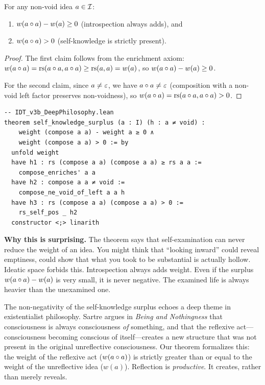 \begin{theorem}
\label{thm:self-knowledge-surplus}
For any non-void idea $a \in \mathcal{I}$:
\begin{enumerate}
\item $w(a \circ a) - w(a) \geq 0$
\hfill (introspection always adds), and
\item $w(a \circ a) > 0$
\hfill (self-knowledge is strictly present).
\end{enumerate}
\end{theorem}

\begin{proof}
The first claim follows from the enrichment axiom:
$w(a \circ a) = \mathrm{rs}(a \circ a, a \circ a)
\geq \mathrm{rs}(a, a) = w(a)$, so $w(a \circ a) - w(a) \geq 0$.

For the second claim, since $a \neq \varepsilon$, we have
$a \circ a \neq \varepsilon$ (composition with a non-void left factor
preserves non-voidness), so
$w(a \circ a) = \mathrm{rs}(a \circ a, a \circ a) > 0$.
\end{proof}

\begin{lstlisting}
-- IDT_v3b_DeepPhilosophy.lean
theorem self_knowledge_surplus (a : I) (h : a ≠ void) :
    weight (compose a a) - weight a ≥ 0 ∧
    weight (compose a a) > 0 := by
  unfold weight
  have h1 : rs (compose a a) (compose a a) ≥ rs a a :=
    compose_enriches' a a
  have h2 : compose a a ≠ void :=
    compose_ne_void_of_left a a h
  have h3 : rs (compose a a) (compose a a) > 0 :=
    rs_self_pos _ h2
  constructor <;> linarith
\end{lstlisting}

\begin{surprisebox}
\textbf{Why this is surprising.} The theorem says that self-examination
can never reduce the weight of an idea. You might think that ``looking
inward'' could reveal emptiness, could show that what you took to be
substantial is actually hollow. Ideatic space forbids this.
Introspection always adds weight. Even if the surplus
$w(a \circ a) - w(a)$ is very small, it is never negative. The
examined life is always heavier than the unexamined one.
\end{surprisebox}

The non-negativity of the self-knowledge surplus echoes a deep theme
in existentialist philosophy. Sartre argues in \textit{Being and
Nothingness} that consciousness is always consciousness \emph{of}
something, and that the reflexive act---consciousness becoming conscious
of itself---creates a new structure that was not present in the original
unreflective consciousness. Our theorem formalizes this: the weight of
the reflexive act ($w(a \circ a)$) is strictly greater than or equal
to the weight of the unreflective idea ($w(a)$). Reflection is
\emph{productive}. It creates, rather than merely reveals.

